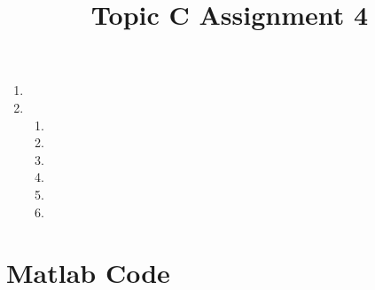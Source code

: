 \documentclass{X:/Documents/Coding/Latex/myassignment}
\title{Topic C Assignment 4}
\begin{document}
\maketitle

\begin{enumerate}
	\item 
	\item 
	\begin{enumerate}
		\item 
		\item 
		\item 
		\item 
		\item 
		\item 
	\end{enumerate}
\end{enumerate}	


\section*{Matlab Code}


\clearpage

\end{document}
